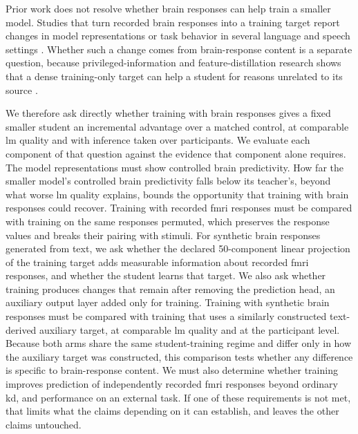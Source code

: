 Prior work does not resolve whether brain responses can help train a smaller model.
Studies that turn recorded brain responses into a training target report changes in model representations or task behavior in several language and speech settings \autocite{moussa2025,negi2025,merlinData2026,vaidya2026}.
Whether such a change comes from brain-response content is a separate question, because privileged-information and feature-distillation research shows that a dense training-only target can help a student for reasons unrelated to its source \autocite{lopezpaz2016,saadi2025}.

We therefore ask directly whether training with brain responses gives a fixed smaller student an incremental advantage over a matched control, at comparable \ac{lm} quality and with inference taken over participants.
We evaluate each component of that question against the evidence that component alone requires.
The model representations must show controlled brain predictivity.
How far the smaller model's controlled brain predictivity falls below its teacher's, beyond what worse \ac{lm} quality explains, bounds the opportunity that training with brain responses could recover.
Training with recorded \ac{fmri} responses must be compared with training on the same responses permuted, which preserves the response values and breaks their pairing with stimuli.
For synthetic brain responses generated from text, we ask whether the declared 50-component linear projection of the training target adds measurable information about recorded \ac{fmri} responses, and whether the student learns that target.
We also ask whether training produces changes that remain after removing the prediction head, an auxiliary output layer added only for training.
Training with synthetic brain responses must be compared with training that uses a similarly constructed text-derived auxiliary target, at comparable \ac{lm} quality and at the participant level.
Because both arms share the same student-training regime and differ only in how the auxiliary target was constructed, this comparison tests whether any difference is specific to brain-response content.
We must also determine whether training improves prediction of independently recorded \ac{fmri} responses beyond ordinary \ac{kd}, and performance on an external task.
If one of these requirements is not met, that limits what the claims depending on it can establish, and leaves the other claims untouched.

